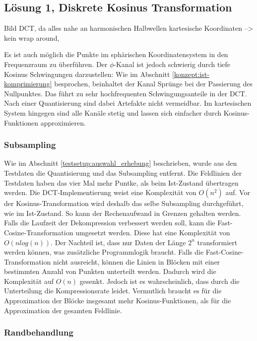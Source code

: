 \subsection{Lösung 1, Diskrete Kosinus Transformation}
Bild
DCT, da alles nahe an harmonischen Halbwellen
kartesische Koordinaten --> kein wrap around,

Es ist auch möglich die Punkte im sphärischen Koordinatensystem in den Frequenzraum zu überführen. Der $\phi$-Kanal ist jedoch schwierig durch tiefe Kosinus Schwingungen darzustellen: Wie im Abschnitt \ref{konzept:ist-komprimierung} besprochen, beinhaltet der Kanal Sprünge bei der Passierung des Nullpunktes. Das führt zu sehr hochfrequenten Schwingungsanteile in der DCT. Nach einer Quantisierung sind dabei Artefakte nicht vermeidbar. Im kartesischen System hingegen sind alle Kanäle stetig und lassen sich einfacher durch Kosinus-Funktionen approximieren.\\

\subsubsection{Subsampling} \label{konzept:loesung1:subsampling}
Wie im Abschnitt \ref{testsetup:auswahl_erhebung} beschrieben, wurde aus den Testdaten die Quantisierung und das Subsampling entfernt. Die Feldlinien der Testdaten haben das vier Mal mehr Puntke, als beim Ist-Zustand übertragen werden. Die DCT-Implementierung weist eine Komplexität von $O(n^2)$ auf. Vor der Kosinus-Transformation wird deshalb das selbe Subsampling durchgeführt, wie im Ist-Zustand. So kann der Rechenaufwand in Grenzen gehalten werden.\\
Falls die Laufzeit der Dekompression verbessert werden soll, kann die Fast-Cosine-Transformation umgesetzt werden. Diese hat eine Komplexität von $O(n log(n))$. Der Nachteil ist, dass nur Daten der Länge $2^n$ transformiert werden können, was zusätzliche Programmlogik braucht. Falls die Fast-Cosine-Transformation nicht ausreicht, können die Linien in Blöcken mit einer bestimmten Anzahl von Punkten unterteilt werden. Dadurch wird die Komplexität auf $O(n)$ gesenkt. Jedoch ist es wahrscheinlich, dass durch die Unterteilung die Kompressionsrate leidet. Vermutlich braucht es für die Approximation der Blöcke insgesamt mehr Kosinus-Funktionen, als für die Approximation der gesamten Feldlinie.\\

\subsubsection{Randbehandlung} \label{konzept:loesung1:randbehandlung}

